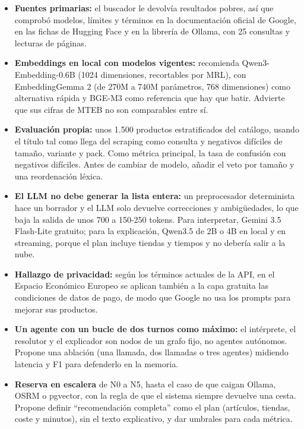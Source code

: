 \begin{tcolorbox}[colback=responsecolor, title=Insights de DeepSeek, colframe=gray!60!black, breakable]
	\begin{itemize}
		\item \textbf{Fuentes primarias:} el buscador le devolvía resultados pobres, así que comprobó modelos, límites y términos en la documentación oficial de Google, en las fichas de Hugging Face y en la librería de Ollama, con 25 consultas y lecturas de páginas.

		\item \textbf{Embeddings en local con modelos vigentes:} recomienda Qwen3-Embedding-0.6B (1024 dimensiones, recortables por MRL), con EmbeddingGemma 2 (de 270M a 740M parámetros, 768 dimensiones) como alternativa rápida y BGE-M3 como referencia que hay que batir. Advierte que sus cifras de MTEB no son comparables entre sí.

		\item \textbf{Evaluación propia:} unos 1.500 productos estratificados del catálogo, usando el título tal como llega del scraping como consulta y negativos difíciles de tamaño, variante y pack. Como métrica principal, la tasa de confusión con negativos difíciles. Antes de cambiar de modelo, añadir el veto por tamaño y una reordenación léxica.

		\item \textbf{El LLM no debe generar la lista entera:} un preprocesador determinista hace un borrador y el LLM solo devuelve correcciones y ambigüedades, lo que baja la salida de unos 700 a 150-250 tokens. Para interpretar, Gemini 3.5 Flash-Lite gratuito; para la explicación, Qwen3.5 de 2B o 4B en local y en streaming, porque el plan incluye tiendas y tiempos y no debería salir a la nube.

		\item \textbf{Hallazgo de privacidad:} según los términos actuales de la API, en el Espacio Económico Europeo se aplican también a la capa gratuita las condiciones de datos de pago, de modo que Google no usa los prompts para mejorar sus productos.

		\item \textbf{Un agente con un bucle de dos turnos como máximo:} el intérprete, el resolutor y el explicador son nodos de un grafo fijo, no agentes autónomos. Propone una ablación (una llamada, dos llamadas o tres agentes) midiendo latencia y F1 para defenderlo en la memoria.

		\item \textbf{Reserva en escalera} de N0 a N5, hasta el caso de que caigan Ollama, OSRM o pgvector, con la regla de que el sistema siempre devuelve una cesta. Propone definir ``recomendación completa'' como el plan (artículos, tiendas, coste y minutos), sin el texto explicativo, y dar umbrales para cada métrica.


\end{itemize}
\end{tcolorbox}
